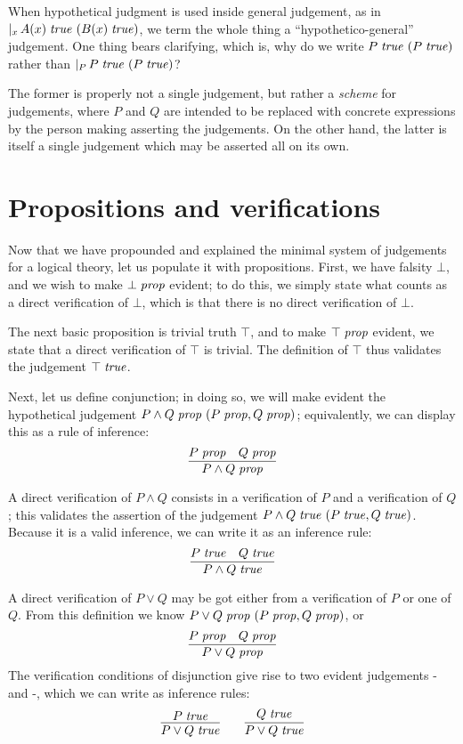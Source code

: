 \documentclass[main.tex]{subfiles}
\begin{document}
When hypothetical judgment is used inside general judgement, as in
$\lvert_{x}\,A(x)\;\mathit{true}\ (B(x)\;\mathit{true})$, we term the whole
thing a ``hypothetico-general'' judgement. One thing bears clarifying,
which is, why do we write $P\;\mathit{true}\ (P\;\mathit{true})$ rather than
$\lvert_{P}\,P\;\mathit{true}\ (P\;\mathit{true})$?

The former is properly not a single judgement, but rather a \emph{scheme} for
judgements, where $P$ and $Q$ are intended to be replaced with concrete
expressions by the person making asserting the judgements. On the other hand, the
latter is itself a single judgement which may be asserted all on its own.

\section{Propositions and verifications}
Now that we have propounded and explained the minimal system of judgements for
a logical theory, let us populate it with propositions. First, we have falsity
$\bot$, and we wish to make $\bot\;\mathit{prop}$ evident; to do this, we simply state
what counts as a direct verification of $\bot$, which is that there is no
direct verification of $\bot$.

The next basic proposition is trivial truth $\top$, and to make $\top\;\mathit{prop}$
evident, we state that a direct verification of $\top$ is trivial. The definition
of $\top$ thus validates the judgement $\top\;\mathit{true}$.

Next, let us define conjunction; in doing so, we will make evident the
hypothetical judgement $P\land Q\;\mathit{prop}\ (P\;\mathit{prop},Q\;\mathit{prop})$;
equivalently, we can display this as a rule of inference:
\[
  \infer{
    \isprop{P\land Q}
  }{
    \isprop{P} &
    \isprop{Q}
  }
\]

A direct verification of $P\land Q$ consists in a verification of $P$
and a verification of $Q$; this validates the assertion of the judgement
$P\land Q\;\mathit{true}\ (P\;\mathit{true},Q\;\mathit{true})$. Because it is a valid
inference, we can write it as an inference rule:
\[
  \infer{
    \istrue{P\land Q}
  }{
    \istrue{P} &
    \istrue{Q}
  }
\]

A direct verification of $P\lor Q$ may be got either from a verification
of $P$ or one of $Q$. From this definition we know $P\lor
Q\;\mathit{prop}\ (P\;\mathit{prop},Q\;\mathit{prop})$, or
\[
  \infer{
    \isprop{P\lor Q}
  }{
    \isprop{P} &
    \isprop{Q}
  }
\]
The verification conditions of disjunction give
rise to two evident judgements \hyp{}{} and
\hyp{}{}, which we can write as inference rules:
\begin{gather*}
  \infer{
    \istrue{P\lor Q}
  }{
    \istrue{P}
  }
  \qquad
  \infer{
    \istrue{P\lor Q}
  }{
    \istrue{Q}
  }
\end{gather*}
\end{document}
